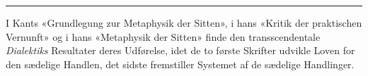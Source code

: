 \documentclass[12pt,a4paper]{book}
\newcommand{\divrule}{\begin{center}\rule{2cm}{0.4pt}\end{center}}
\begin{document}
\divrule

I Kants «Grundlegung zur Metaphysik der Sitten», i hans
«Kritik der praktischen Vernunft» og i hans «Metaphysik der
Sitten» finde den transscendentale \emph{Dialektiks} Resultater
deres Udførelse, idet de to første Skrifter udvikle Loven for
den sædelige Handlen, det sidste fremstiller Systemet af de
sædelige Handlinger.
\end{document}
